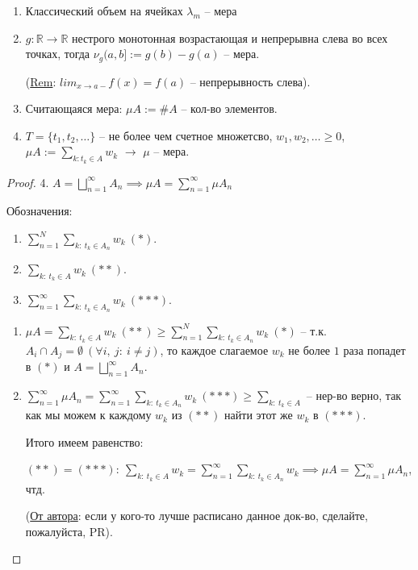 \begin{example}
    \begin{enumerate}
        \item Классический объем на ячейках $\lambda_m$ -- мера
        \item {
            $g : \mathbb{R} \rightarrow \mathbb{R}$ нестрого монотонная возрастающая и непрерывна слева во всех точках, тогда $\nu_g (a, b]:=g(b) - g(a)$ -- мера.

            (\underline{Rem}: $lim_{x \rightarrow a-} f(x) = f(a)$ -- непрерывность слева).
        }
        \item Считающаяся мера: $\mu A := \#A$ -- кол-во элементов.
        \item $T = \{t_1, t_2, \dots \}$ -- не более чем счетное множетсво, $w_1, w_2, \dots \geq 0$, $\mu A := \sum_{k: t_k \in A} w_k$ $\rightarrow$ $\mu$ -- мера.
    \end{enumerate}
\end{example}

\begin{proof}
    4. $A = \bigsqcup_{n=1}^{\infty} A_n \implies \mu A = \sum_{n=1}^{\infty} \mu A_n$

    Обозначения:

    \begin{enumerate}
        \item $\sum_{n=1}^{N} \sum_{k: \ t_k \in A_n} w_k \ (*)$.
        \item $\sum_{k: \ t_k \in A} w_k \ (**)$.
        \item $\sum_{n=1}^{\infty} \sum_{k: \ t_k \in A_n} w_k \ (***)$.
    \end{enumerate}

    \begin{enumerate}
        \item {
            $\mu A = \sum_{k: \ t_k \in A} w_k \ (**) \geq \sum_{n=1}^{N} \sum_{k: \ t_k \in A_n} w_k \ (*)$ -- т.к. $A_i \cap A_j = \emptyset \ (\forall i, \ j: \ i \neq j)$, то каждое слагаемое $w_k$ не более $1$ раза попадет в $(*)$ и $A = \bigsqcup_{n=1}^{\infty} A_n$.
        }

        \item {
            $\sum_{n=1}^{\infty} \mu A_n = \sum_{n=1}^{\infty} \sum_{k: \ t_k \in A_n} w_k \ (***) \geq \sum_{k: \ t_k \in A}$ -- нер-во верно, так как мы можем к каждому $w_k$ из $(**)$ найти этот же $w_k$ в $(***)$. 
        }

        Итого имеем равенство:

        $(**) = (***): \ \sum_{k: \ t_k \in A} w_k = \sum_{n=1}^{\infty} \sum_{k: \ t_k \in A_n} w_k \implies \mu A = \sum_{n=1}^{\infty} \mu A_n$, чтд.

        (\underline{От автора}: если у кого-то лучше расписано данное док-во, сделайте, пожалуйста, PR).
    \end{enumerate}
\end{proof}

